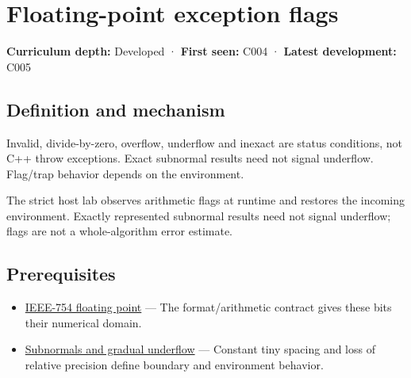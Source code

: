 \hypertarget{appendix-ed8531b46754}{}\label{referencestart:appendix-ed8531b46754}
\section{Floating-point exception flags}\label{appendix-ed8531b46754-floating-point-exception-flags}

\hypertarget{appendix-ed8531b46754-floating-point-exception-flags}{}

\textbf{Curriculum depth:} Developed · \textbf{First seen:} C004 · \textbf{Latest development:} C005

\begin{allmightroledefinition}

\subsection{Definition and mechanism}\label{appendix-ed8531b46754-definition-and-mechanism}

\hypertarget{appendix-ed8531b46754-definition-and-mechanism}{}

Invalid, divide-by-zero, overflow, underflow and inexact are status conditions, not C++ throw exceptions. Exact subnormal results need not signal underflow. Flag/trap behavior depends on the environment.

\end{allmightroledefinition}

The strict host lab observes arithmetic flags at runtime and restores the incoming environment. Exactly represented subnormal results need not signal underflow; flags are not a whole-algorithm error estimate.

\subsection{Prerequisites}\label{appendix-ed8531b46754-prerequisites}

\hypertarget{appendix-ed8531b46754-prerequisites}{}

\begin{itemize}
\tightlist
\item
  \hyperref[appendix-343615f49ddf]{IEEE-754 floating point} --- The format/arithmetic contract gives these bits their numerical domain.
\item
  \hyperref[appendix-00a6e044c437]{Subnormals and gradual underflow} --- Constant tiny spacing and loss of relative precision define boundary and environment behavior.
\end{itemize}

